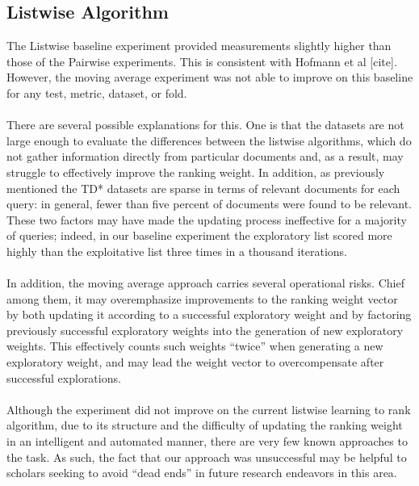 \documentclass{acm_proc_article-sp}
\begin{document}
\subsection{Listwise Algorithm}
The Listwise baseline experiment provided measurements slightly higher than those of the Pairwise experiments.  This is consistent with Hofmann et al [cite].  However, the moving average experiment was not able to improve on this baseline for any test, metric, dataset, or fold.  \\ \\
There are several possible explanations for this.  One is that the datasets are not large enough to evaluate the differences between the listwise algorithms, which do not gather information directly from particular documents and, as a result, may struggle to effectively improve the ranking weight.  In addition, as previously mentioned the TD* datasets are sparse in terms of relevant documents for each query: in general, fewer than five percent of documents were found to be relevant.  These two factors may have made the updating process ineffective for a majority of queries; indeed, in our baseline experiment the exploratory list scored more highly than the exploitative list three times in a thousand iterations. \\ \\
In addition, the moving average approach carries several operational risks.  Chief among them, it may overemphasize improvements to the ranking weight vector by both updating it according to a successful exploratory weight and by factoring previously successful exploratory weights into the generation of new exploratory weights.  This effectively counts such weights “twice” when generating a new exploratory weight, and may lead the weight vector to overcompensate after successful explorations.  \\ \\
Although the experiment did not improve on the current listwise learning to rank algorithm, due to its structure and the difficulty of updating the ranking weight in an intelligent and automated manner, there are very few known approaches to the task.  As such, the fact that our approach was unsuccessful may be helpful to scholars seeking to avoid “dead ends” in future research endeavors in this area. 
\end{document}
